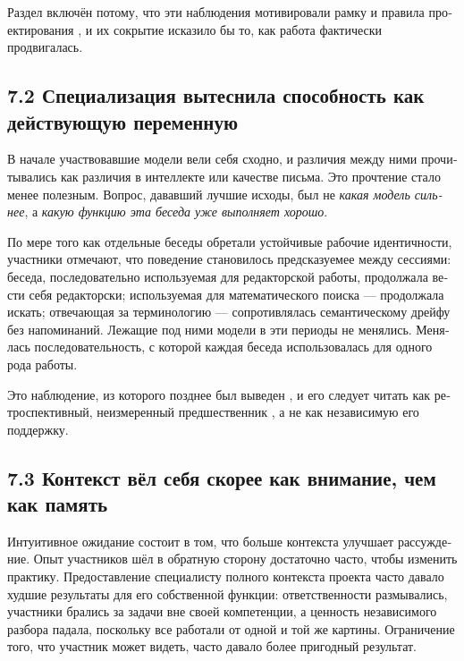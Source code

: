 \begin{russian}
Раздел включён потому, что эти наблюдения мотивировали рамку  и правила проектирования , и их сокрытие исказило бы то, как работа фактически продвигалась.


\subsection*{7.2 Специализация вытеснила способность как действующую переменную}
\label{sec:ru:7.2}

В начале участвовавшие модели вели себя сходно, и различия между ними прочитывались как различия в интеллекте или качестве письма. Это прочтение стало менее полезным. Вопрос, дававший лучшие исходы, был не \emph{какая модель сильнее}, а \emph{какую функцию эта беседа уже выполняет хорошо}.

По мере того как отдельные беседы обретали устойчивые рабочие идентичности, участники отмечают, что поведение становилось предсказуемее между сессиями: беседа, последовательно используемая для редакторской работы, продолжала вести себя редакторски; используемая для математического поиска — продолжала искать; отвечающая за терминологию — сопротивлялась семантическому дрейфу без напоминаний. Лежащие под ними модели в эти периоды не менялись. Менялась последовательность, с которой каждая беседа использовалась для одного рода работы.

Это наблюдение, из которого позднее был выведен , и его следует читать как ретроспективный, неизмеренный предшественник , а не как независимую его поддержку.


\subsection*{7.3 Контекст вёл себя скорее как внимание, чем как память}
\label{sec:ru:7.3}

Интуитивное ожидание состоит в том, что больше контекста улучшает рассуждение. Опыт участников шёл в обратную сторону достаточно часто, чтобы изменить практику. Предоставление специалисту полного контекста проекта часто давало худшие результаты для его собственной функции: ответственности размывались, участники брались за задачи вне своей компетенции, а ценность независимого разбора падала, поскольку все работали от одной и той же картины. Ограничение того, что участник может видеть, часто давало более пригодный результат.


\end{russian}
